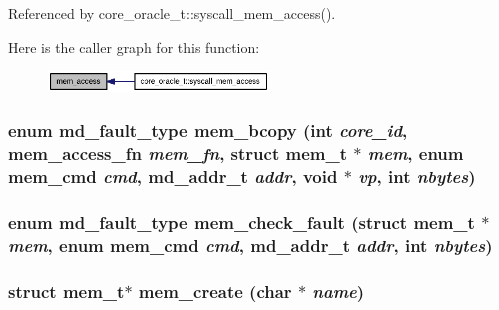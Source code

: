 Referenced by core\_\-oracle\_\-t::syscall\_\-mem\_\-access().

Here is the caller graph for this function:\nopagebreak
\begin{figure}[H]
\begin{center}
\leavevmode
\includegraphics[width=166pt]{memory_8h_2b4368bb43fd552750bdf3f6e59b7c46_icgraph}
\end{center}
\end{figure}
\subsubsection[{mem\_\-bcopy}]{\setlength{\rightskip}{0pt plus 5cm}enum {\bf md\_\-fault\_\-type} mem\_\-bcopy (int {\em core\_\-id}, \/  {\bf mem\_\-access\_\-fn} {\em mem\_\-fn}, \/  struct {\bf mem\_\-t} $\ast$ {\em mem}, \/  enum {\bf mem\_\-cmd} {\em cmd}, \/  {\bf md\_\-addr\_\-t} {\em addr}, \/  void $\ast$ {\em vp}, \/  int {\em nbytes})}\label{memory_8h_9a8495a85883df0c1bef27d5acebad76}


\subsubsection[{mem\_\-check\_\-fault}]{\setlength{\rightskip}{0pt plus 5cm}enum {\bf md\_\-fault\_\-type} mem\_\-check\_\-fault (struct {\bf mem\_\-t} $\ast$ {\em mem}, \/  enum {\bf mem\_\-cmd} {\em cmd}, \/  {\bf md\_\-addr\_\-t} {\em addr}, \/  int {\em nbytes})}\label{memory_8h_369c3899ce6c337db4b74ddb1bdebc07}


\subsubsection[{mem\_\-create}]{\setlength{\rightskip}{0pt plus 5cm}struct {\bf mem\_\-t}$\ast$ mem\_\-create (char $\ast$ {\em name})\hspace{0.3cm}{\tt  [read]}}\label{memory_8h_5ef01d16da6ed478b982aec02df12ce1}



